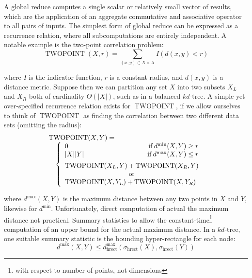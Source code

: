 \documentclass[times, 10pt,twocolumn]{article}
\DeclareMathOperator{\TWOPT}{TWOPOINT}
\DeclareMathOperator{\hrect}{hrect}
\DeclareMathOperator{\IF}{if}
\begin{document}
A global reduce computes a single scalar or relatively small vector of results, which are the application of an aggregate commutative and associative operator to all pairs of inputs.
The simplest form of global reduce can be expressed as a recurrence relation, where all subcomputations are entirely independent.
A notable example is the two-point correlation problem:
\begin{equation*}
  \TWOPT(X, r) = \sum_{(x, y) \in X \times X} I(d(x, y) < r)
\end{equation*}

\noindent where $I$ is the indicator function, $r$ is a constant radius, and $d(x, y)$ is a distance metric.
Suppose then we can partition any set $X$ into two subsets $X_L$ and $X_R$ both of cardinality $\Theta(|X|)$, such as in a balanced $kd$-tree.
A simple yet over-specified recurrence relation exists for $\TWOPT$, if we allow ourselves to think of $\TWOPT$ as finding the correlation between two different data sets (omitting the radius):
\begin{equation}
 \begin{array}{ll}
  \lefteqn{\TWOPT(X, Y) =}
  \\
  & \left\{
    \begin{array}{lr}
      0 & \IF d^{\min}(X, Y) \geq r
      \\
      |X||Y| & \IF d^{\max}(X, Y) \leq r
      \vspace{0.07in}
      \\
      \multicolumn{2}{l}{\TWOPT(X_L, Y) + \TWOPT(X_R, Y)}
      \\
      \multicolumn{2}{c}{\scriptstyle{\mbox{\small{or}}}}
      \\
      \multicolumn{2}{l}{\TWOPT(X, Y_L) + \TWOPT(X, Y_R)}
    \end{array}
  \right.
 \end{array}
\end{equation}

\noindent where $d^{\max}(X, Y)$ is the maximum distance between any two points in $X$ and $Y$, likewise for $d^{\min}$.
Unfortunately, direct computation of actual the maximum distance not practical.
Summary statistics to allow the constant-time\footnote{with respect to number of points, not dimensions} computation of an upper bound for the actual maximum distance.
In a $kd$-tree, one suitable summary statistic is the bounding hyper-rectangle for each node:
\begin{equation}
d^{\max}(X, Y) \leq d^{\max}_{\hrect}(\sigma_{\hrect}(X), \sigma_{\hrect}(Y))
\end{equation}
\end{document}
